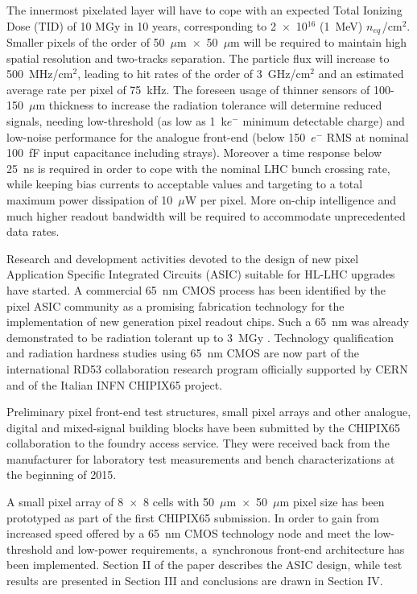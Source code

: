 \documentclass[conference]{./templates/IEEEtran/IEEEtran}
\begin{document}
The innermost pixelated layer will have to cope with an expected Total Ionizing Dose (TID)
of 10 MGy in 10 years, corresponding to 2~$\times$~10$^{16}$ (1~MeV) $n_{eq\,}$/cm$^{2}$. 
Smaller pixels of the order of 50~$\mu$m~$\times$~50~$\mu$m will 
be required to maintain high spatial resolution and two-tracks separation. 
The particle flux will increase to 500~MHz/cm$^2$, leading to hit rates of the order of 3~GHz/cm$^2$
and an estimated average rate per pixel of 75~kHz. The foreseen usage of thinner sensors of 
100-150~$\mu$m thickness to increase the radiation tolerance will determine reduced signals, 
needing low-threshold (as low as 1~k$e^-$ minimum detectable charge)
and low-noise performance for the analogue front-end (below 150~$e^-$ RMS at nominal 100~fF input capacitance including strays).
Moreover a time response below 25~ns is required in order to cope with the nominal 
LHC bunch crossing rate, while keeping bias currents to acceptable 
values and targeting to a total maximum power dissipation of 10~$\mu$W per pixel. More on-chip
intelligence and much higher readout bandwidth will be required to accommodate unprecedented data rates. 


Research and development activities devoted to the design of new pixel Application Specific Integrated 
Circuits (ASIC) suitable for HL-LHC upgrades have started. 
A commercial 65~nm CMOS process has been identified by the pixel ASIC community 
as a promising fabrication technology for the implementation of new generation pixel readout chips. 
Such a 65~nm was already demonstrated to be radiation tolerant up to 3~MGy \cite{Bonacini2011}. 
Technology qualification and radiation hardness studies using 65~nm CMOS are now part of the 
international RD53 collaboration research program officially supported 
by CERN \cite{Christiansen2013} and of the Italian INFN CHIPIX65 project.

Preliminary pixel front-end test structures, small pixel arrays and 
other analogue, digital and mixed-signal building blocks have been submitted 
by the CHIPIX65 collaboration to the foundry access service. 
They were received back from the manufacturer for laboratory test measurements 
and bench characterizations at the beginning of 2015.


A small pixel array of 8~$\times$~8 cells with 50~$\mu$m~$\times$~50~$\mu$m 
pixel size has been prototyped as part of the first 
CHIPIX65 submission. In order to gain from increased speed
offered by a 65~nm CMOS technology node and meet the low-threshold and low-power requirements, 
a~synchronous front-end architecture has been implemented. 
Section II of the paper describes the ASIC design, while test results are presented in Section III 
and conclusions are drawn in Section IV.
\end{document}
